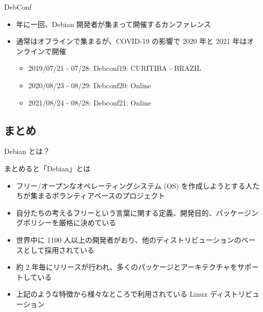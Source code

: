 \begin{frame}{DebConf}%
  
\begin{itemize}
\item 年に一回、Debian 開発者が集まって開催するカンファレンス
\item 通常はオフラインで集まるが、COVID-19 の影響で 2020 年と 2021 年はオンラインで開催
  \begin{itemize}
  \item 2019/07/21 - 07/28: Debconf19: CURITIBA - BRAZIL
  \item 2020/08/23 - 08/29: Debconf20: Online
  \item 2021/08/24 - 08/28: Debconf21: Online
  \end{itemize}
\end{itemize}

\begin{center}
\end{center}

\end{frame}

\subsection{まとめ}

\begin{frame}{Debian とは？}
  
まとめると「Debian」とは

\begin{itemize}
  \item フリー/オープンなオペレーティングシステム (OS) を作成しようとする人たちが集まるボランティアベースのプロジェクト
  \item 自分たちの考えるフリーという言葉に関する定義、開発目的、パッケージングポリシーを厳格に決めている
  \item 世界中に 1100 人以上の開発者がおり、他のディストリビューションのベースとして採用されている
  \item 約 2 年毎にリリースが行われ、多くのパッケージとアーキテクチャをサポートしている
  \item 上記のような特徴から様々なところで利用されている Linux ディストリビューション
\end{itemize}

\end{frame}


